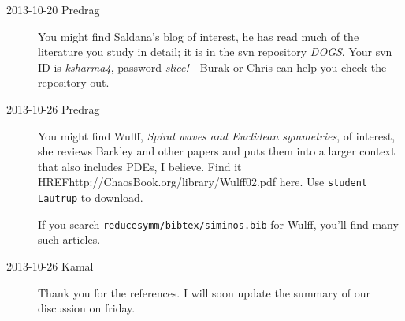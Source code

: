 \begin{description}
\item[2013-10-20 Predrag] You might find Saldana's blog of interest, he
has read much of the literature you study in detail; it is
in the svn repository \emph{DOGS}. Your svn ID is \emph{ksharma4},
password \emph{slice!} - Burak or Chris can help you check the repository
out.

\item[2013-10-26 Predrag] You might find
Wulff, {\em Spiral waves and {Euclidean} symmetries}, of
interest, she reviews Barkley and other papers and puts them into a
larger context that also includes PDEs, I believe. Find it
HREF{http://ChaosBook.org/library/Wulff02.pdf} {here}. Use
\texttt{student} \texttt{Lautrup} to download.

If you search \texttt{reducesymm/bibtex/siminos.bib} for Wulff,
you'll find many such articles.

\item[2013-10-26 Kamal] Thank you for the references. I will soon
update the summary of our discussion on friday.

\end{description}
\renewcommand{\ssp}{a}
